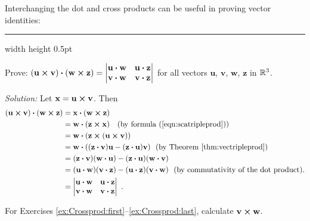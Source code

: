 Interchanging the dot and cross products can be useful in proving vector identities:

\medskip
\hrule width \textwidth height 0.5pt
\begin{exmp}\label{exmp:quadcrossdot}
 Prove: $(\mathbf{u} \bm{\times} \mathbf{v}) \bm{\cdot} (\mathbf{w} \bm{\times} \mathbf{z}) =
 \begin{vmatrix}
   \mathbf{u} \bm{\cdot} \mathbf{w} & \mathbf{u} \bm{\cdot} \mathbf{z}\\
   \mathbf{v} \bm{\cdot} \mathbf{w} & \mathbf{v} \bm{\cdot} \mathbf{z}\end{vmatrix}$ for all vectors $\mathbf{u}$,
   $\mathbf{v}$, $\mathbf{w}$, $\mathbf{z}$ in $\mathbb{R}^{3}$.
   \smallskip
 \par\noindent\emph{Solution:} Let $\mathbf{x} = \mathbf{u} \bm{\times} \mathbf{v}$. Then
 \begin{align*}
  (\mathbf{u} \bm{\times} \mathbf{v}) \bm{\cdot} (\mathbf{w} \bm{\times} \mathbf{z}) &=
   \mathbf{x} \bm{\cdot} (\mathbf{w} \bm{\times} \mathbf{z})\\
  &= \mathbf{w} \bm{\cdot} (\mathbf{z} \bm{\times} \mathbf{x}) \text{~~~(by formula (\ref{eqn:scatripleprod}))}\\
  &= \mathbf{w} \bm{\cdot} (\mathbf{z} \bm{\times} (\mathbf{u} \bm{\times} \mathbf{v}))\\
  &= \mathbf{w} \bm{\cdot} ((\mathbf{z} \bm{\cdot} \mathbf{v})\mathbf{u} -
   (\mathbf{z} \bm{\cdot} \mathbf{u})\mathbf{v}) \text{~~(by Theorem \ref{thm:vectripleprod})}\\
  &= (\mathbf{z} \bm{\cdot} \mathbf{v})(\mathbf{w} \bm{\cdot} \mathbf{u}) -
  (\mathbf{z} \bm{\cdot} \mathbf{u})(\mathbf{w} \bm{\cdot} \mathbf{v})\\
  &= (\mathbf{u} \bm{\cdot} \mathbf{w})(\mathbf{v} \bm{\cdot} \mathbf{z}) -
  (\mathbf{u} \bm{\cdot} \mathbf{z})(\mathbf{v} \bm{\cdot} \mathbf{w}) \text{~~(by commutativity of the dot product).}\\
  &= \begin{vmatrix}
   \mathbf{u} \bm{\cdot} \mathbf{w} & \mathbf{u} \bm{\cdot} \mathbf{z}\\
   \mathbf{v} \bm{\cdot} \mathbf{w} & \mathbf{v} \bm{\cdot} \mathbf{z}\end{vmatrix}~.
 \end{align*}
\end{exmp}
\startexercises\label{sec1dot4}
\par\noindent For Exercises \ref{ex:Crossprod:first}--\ref{ex:Crossprod:last}, calculate $\mathbf{v} \bm{\times} \mathbf{w}$.
